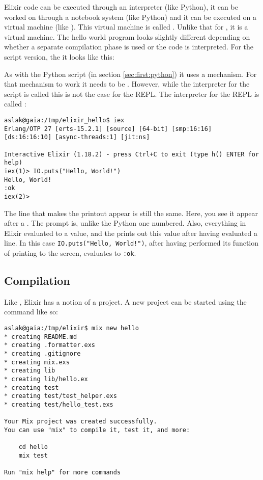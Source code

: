 Elixir code can be executed through an interpreter (like Python), it can be worked on through a notebook system (like Python) and it can be executed on a virtual machine (like \csharp). This virtual machine is called . Unlike that for \csharp, it is a  virtual machine. The hello world program looks slightly different depending on whether a separate compilation phase is used or the code is interpreted. For the script version, the it looks like this:


As with the Python script (in section \ref{sec:first:python}) it uses a  mechanism. For that mechanism to work it needs to be . However, while the interpreter for the script is called  this is not the case for the REPL. The interpreter for the REPL is called :

\begin{verbatim}
aslak@gaia:/tmp/elixir_hello$ iex
Erlang/OTP 27 [erts-15.2.1] [source] [64-bit] [smp:16:16] [ds:16:16:10] [async-threads:1] [jit:ns]

Interactive Elixir (1.18.2) - press Ctrl+C to exit (type h() ENTER for help)
iex(1)> IO.puts("Hello, World!")
Hello, World!
:ok
iex(2)> 
\end{verbatim}
The line that makes the printout appear is still the same. Here, you see it appear after a . The  prompt is, unlike the Python one numbered. Also, everything in Elixir evaluated to a value, and the  prints out this value after having evaluated a line. In this case \texttt{IO.puts("Hello, World!")}, after having performed its function of printing  to the screen, evaluates to \texttt{:ok}.

\subsection{Compilation}

Like \csharp, Elixir has a notion of a project. A new project can be started using the  command like so:

\begin{verbatim}
aslak@gaia:/tmp/elixir$ mix new hello
* creating README.md
* creating .formatter.exs
* creating .gitignore
* creating mix.exs
* creating lib
* creating lib/hello.ex
* creating test
* creating test/test_helper.exs
* creating test/hello_test.exs

Your Mix project was created successfully.
You can use "mix" to compile it, test it, and more:

    cd hello
    mix test

Run "mix help" for more commands
\end{verbatim}

